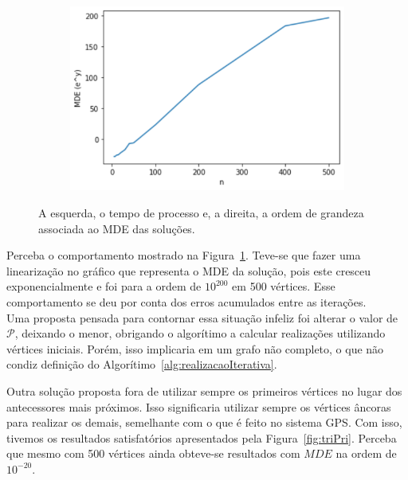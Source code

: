 \documentclass[a4paper,12pt]{article}
\begin{document}
\begin{figure}[H]
\begin{center}
\begin{minipage}{0.45 \linewidth}
				\begin{figure}[H]
					\begin{center}
						\includegraphics[width=1\linewidth]{figures/mdeTri.png}
					\end{center}
				\end{figure}
			\end{minipage}
		\end{center}
		\caption{A esquerda, o tempo de processo e, a direita, a ordem de grandeza associada ao MDE das soluções.}
		\label{fig:tri}
	\end{figure}
	
	Perceba o comportamento mostrado na Figura~\ref{fig:tri}. Teve-se que fazer uma linearização no gráfico que representa o MDE da solução, pois este cresceu exponencialmente e foi para a ordem de $10^{200}$ em 500 vértices. Esse comportamento se deu por conta dos erros acumulados entre as iterações.
	\\
	
	Uma proposta pensada para contornar essa situação infeliz foi alterar o valor de $\mathcal{P}$, deixando o menor, obrigando o algorítimo a calcular realizações utilizando vértices iniciais. Porém, isso implicaria em um grafo não completo, o que não condiz definição do Algorítimo~\ref{alg:realizacaoIterativa}.
	
	Outra solução proposta fora de utilizar sempre os primeiros vértices no lugar dos antecessores mais próximos. Isso significaria utilizar sempre os vértices âncoras para realizar os demais, semelhante com o que é feito no sistema GPS. Com isso, tivemos os resultados satisfatórios apresentados pela Figura~\ref{fig:triPri}. Perceba que mesmo com 500 vértices ainda obteve-se resultados com $MDE$ na ordem de $10^{-20}$.
	
\end{document}
